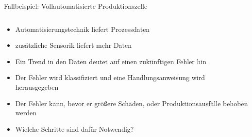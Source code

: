 \documentclass[aspectratio=1610, xcolor=dvipsnames, 9pt]{beamer}
\begin{document}
            \begin{frame}{Fallbeispiel: Vollautomatisierte Produktionszelle}
              \begin{columns}
                \begin{column}{1\textwidth}
                  \begin{itemize}
                    \item Automatisierungstechnik liefert Prozessdaten \newline
                    \item zusätzliche Sensorik liefert mehr Daten \newline
                    \item Ein Trend in den Daten deutet auf einen zukünftigen Fehler hin \newline
                    \item Der Fehler wird klassifiziert und eine Handlungsanweisung wird herausgegeben \newline
                    \item Der Fehler kann, bevor er größere Schäden, oder Produktionsausfälle behoben werden \newline
                    \item Wielche Schritte sind dafür Notwendig?
                  \end{itemize}
                \end{column}
              \end{columns}
                \end{frame}
\end{document}
